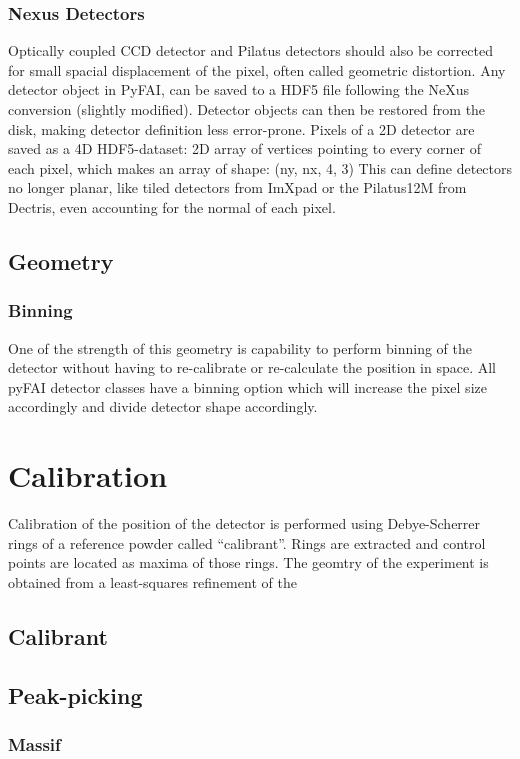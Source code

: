 \documentclass[preprint]{iucr}
\begin{document}
\subsubsection{Nexus Detectors}
Optically coupled CCD detector and Pilatus detectors should also be corrected
for small spacial displacement of the pixel, often called geometric distortion.
Any detector object in PyFAI, can be saved to a HDF5 file
following the NeXus conversion (slightly modified).
Detector objects can then be restored from the disk, making detector definition
less error-prone.
Pixels of a 2D detector are saved as a 4D HDF5-dataset: 2D array of vertices
pointing to every corner of each pixel, which makes an array of shape: (ny, nx, 4, 3)
This can define detectors no longer planar, like tiled detectors from
ImXpad or the Pilatus12M from Dectris, even accounting for the normal of each
pixel.

\subsection{Geometry}

\subsubsection{Binning}
One of the strength of this geometry is capability to perform binning of the
detector without having to re-calibrate or re-calculate the position in space.
All pyFAI detector classes have a binning option which will increase the pixel
size accordingly and divide detector shape accordingly.

\section{Calibration}
Calibration of the position of the detector is performed using Debye-Scherrer
rings of a reference powder called ``calibrant''.
Rings are extracted and control points are located as maxima of those rings.
The geomtry of the experiment is obtained from a least-squares refinement of the


\subsection{Calibrant}
\subsection{Peak-picking}
\subsubsection{Massif}
\end{document}
